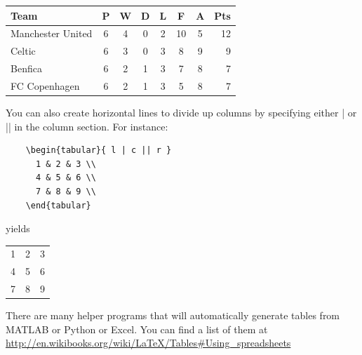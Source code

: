 \documentclass[12pt,a4paper]{article}
\begin{document}
\begin{tabular}{lccccccr}
Team              & P & W & D & L & F  & A & Pts \\
\hline
Manchester United & 6 & 4 & 0 & 2 & 10 & 5 & 12  \\
Celtic            & 6 & 3 & 0 & 3 &  8 & 9 &  9  \\
Benfica           & 6 & 2 & 1 & 3 &  7 & 8 &  7  \\
FC Copenhagen     & 6 & 2 & 1 & 3 &  5 & 8 &  7  \\
\end{tabular}

    \vspace{.5cm}
    You can also create horizontal lines to divide up columns by specifying
    either | or || in the column section.  For instance:
    \vspace{.5cm}

    \begin{verbatim}
    \begin{tabular}{ l | c || r }
      1 & 2 & 3 \\
      4 & 5 & 6 \\
      7 & 8 & 9 \\
    \end{tabular}
    \end{verbatim}
    \vspace{.5cm}

    yields
    \vspace{.5cm}

\begin{tabular}{ l | c || r }
  1 & 2 & 3 \\
  4 & 5 & 6 \\
  7 & 8 & 9 \\
\end{tabular}

  \vspace{.5cm}
  There are many helper programs that will automatically generate tables
  from MATLAB or Python or Excel.  You can find a list of them at
  \url{http://en.wikibooks.org/wiki/LaTeX/Tables#Using_spreadsheets}
\end{document}
